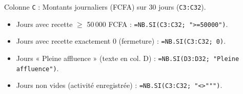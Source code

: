 \documentclass[11pt]{article}
\begin{document}
\begin{exemplebox}
Colonne \texttt{C} : Montants journaliers (FCFA) sur 30 jours (\texttt{C3:C32}).
\begin{itemize}
    \item Jours avec recette $\ge$ 50\,000 FCFA : \texttt{=NB.SI(C3:C32; ">=50000")}.
    \item Jours avec recette exactement 0 (fermeture) : \texttt{=NB.SI(C3:C32; 0)}.
    \item Jours « Pleine affluence » (texte en col. D) : \texttt{=NB.SI(D3:D32; "Pleine affluence")}.
    \item Jours non vides (activité enregistrée) : \texttt{=NB.SI(C3:C32; "<>""")}.
\end{itemize}
\end{exemplebox}
\end{document}
